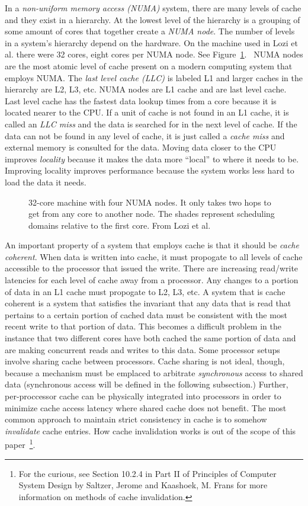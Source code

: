 \documentclass{sig-alternate}
\begin{document}
In a \emph{non-uniform memory access (NUMA)} system, there are many levels of cache and they exist in a hierarchy. At the lowest level of the hierarchy is a grouping of some amount of cores that together create a \emph{NUMA node}. The number of levels in a system's hierarchy depend on the hardware. On the machine used in Lozi et al. there were 32 cores, eight cores per NUMA node. See Figure~\ref{fig:NUMA}.~\cite{Lozi:2016} NUMA nodes are the most atomic level of cache present on a modern computing system that employs NUMA. The \emph{last level cache (LLC)} is labeled L1 and larger caches in the hierarchy are L2, L3, etc. NUMA nodes are L1 cache and are last level cache. Last level cache has the fastest data lookup times from a core because it is located nearer to the CPU. If a unit of cache is not found in an L1 cache, it is called an \emph{LLC miss} and the data is searched for in the next level of cache. If the data can not be found in any level of cache, it is just called a \emph{cache miss} and external memory is consulted for the data. Moving data closer to the CPU improves \emph{locality} because it makes the data more ``local'' to where it needs to be. Improving locality improves performance because the system works less hard to load the data it needs.~\cite{WikiCache}

\begin{figure}
\centering
{}
\caption{32-core machine with four NUMA nodes. It only takes two hops to get from any core to another node. The shades represent scheduling domains relative to the first core.  From Lozi et al.~\cite{Lozi:2016}}
\label{fig:NUMA}
\end{figure}

An important property of a system that employs cache is that it should be \emph{cache coherent}. When data is written into cache, it must propogate to all levels of cache accessible to the processor that issued the write. There are increasing read/write latencies for each level of cache away from a processor. Any changes to a portion of data in an L1 cache must propogate to L2, L3, etc. A system that is cache coherent is a system that satisfies the invariant that any data that is read that pertains to a certain portion of cached data must be consistent with the most recent write to that portion of data. This becomes a difficult problem in the instance that two different cores have both cached the same portion of data and are making concurrent reads and writes to this data. Some processor setups involve sharing cache between processors. Cache sharing is not ideal, though, because a mechanism must be emplaced to arbitrate \emph{synchronous} access to shared data (synchronous access will be defined in the following subsection.) Further, per-proccessor cache can be physically integrated into processors in order to minimize cache access latency where shared cache does not benefit. The most common approach to maintain strict consistency in cache is to somehow \emph{invalidate} cache entries. How cache invalidation works is out of the scope of this paper~\footnote{For the curious, see Section 10.2.4 in Part II of Principles of Computer System Design by Saltzer, Jerome and Kaashoek, M. Frans for more information on methods of cache invalidation.}.~\cite{Systems}
\end{document}
